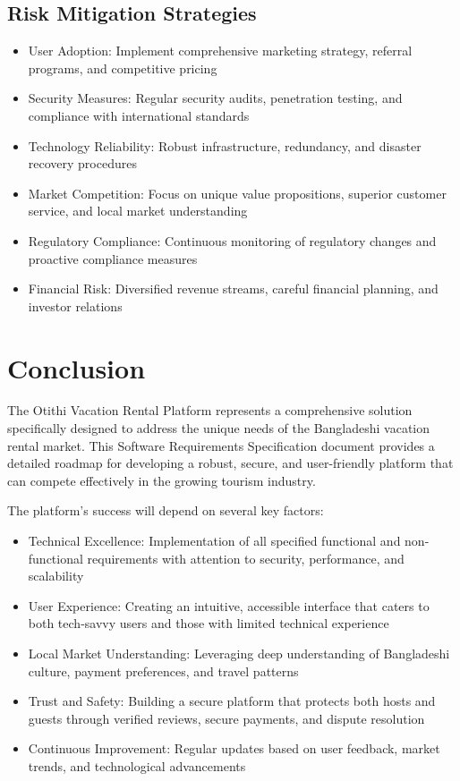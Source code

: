 \documentclass[12pt,a4paper]{report}
\begin{document}
\section{Risk Mitigation Strategies}

\begin{itemize}
    \item User Adoption: Implement comprehensive marketing strategy, referral programs, and competitive pricing
    \item Security Measures: Regular security audits, penetration testing, and compliance with international standards
    \item Technology Reliability: Robust infrastructure, redundancy, and disaster recovery procedures
    \item Market Competition: Focus on unique value propositions, superior customer service, and local market understanding
    \item Regulatory Compliance: Continuous monitoring of regulatory changes and proactive compliance measures
    \item Financial Risk: Diversified revenue streams, careful financial planning, and investor relations
\end{itemize}

\chapter{Conclusion}

The Otithi Vacation Rental Platform represents a comprehensive solution specifically designed to address the unique needs of the Bangladeshi vacation rental market. This Software Requirements Specification document provides a detailed roadmap for developing a robust, secure, and user-friendly platform that can compete effectively in the growing tourism industry.

The platform's success will depend on several key factors:

\begin{itemize}
    \item Technical Excellence: Implementation of all specified functional and non-functional requirements with attention to security, performance, and scalability
    \item User Experience: Creating an intuitive, accessible interface that caters to both tech-savvy users and those with limited technical experience
    \item Local Market Understanding: Leveraging deep understanding of Bangladeshi culture, payment preferences, and travel patterns
    \item Trust and Safety: Building a secure platform that protects both hosts and guests through verified reviews, secure payments, and dispute resolution
    \item Continuous Improvement: Regular updates based on user feedback, market trends, and technological advancements
\end{itemize}
\end{document}
